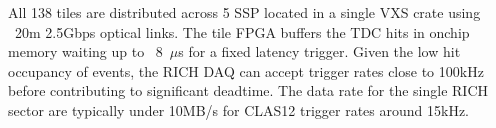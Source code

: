 All 138 tiles are distributed across 5 SSP located in a single VXS crate using ~20m 2.5Gbps optical links. The tile FPGA buffers the TDC hits in onchip memory waiting up to ~8~$\mu$s for a fixed latency trigger. Given the low hit occupancy of events, the RICH DAQ can accept trigger rates close to 100kHz before contributing to significant deadtime. The data rate for the single RICH sector are typically under 10MB/s for CLAS12 trigger rates around 15kHz.


